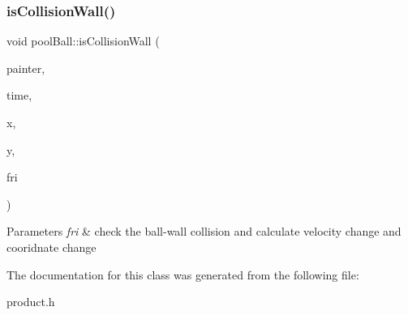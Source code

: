\subsubsection{\texorpdfstring{is\+Collision\+Wall()}{isCollisionWall()}}
{\footnotesize\ttfamily void pool\+Ball\+::is\+Collision\+Wall (\begin{DoxyParamCaption}\item[{Q\+Painter \&}]{painter,  }\item[{unsigned int}]{time,  }\item[{double}]{x,  }\item[{double}]{y,  }\item[{double}]{fri }\end{DoxyParamCaption})\hspace{0.3cm}{\ttfamily [inline]}}


\begin{DoxyParams}{Parameters}
{\em fri} & check the ball-\/wall collision and calculate velocity change and cooridnate change \\
\hline
\end{DoxyParams}


The documentation for this class was generated from the following file\+:\begin{DoxyCompactItemize}
\item 
product.\+h\end{DoxyCompactItemize}
